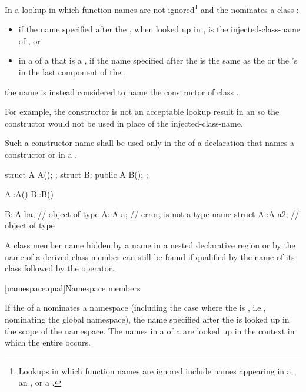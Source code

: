 \pnum
In a lookup in which function names are not ignored\footnote{Lookups in which
function names are ignored include names appearing in a
, an
, or a .}
and the  nominates a class :
\begin{itemize}
\item if the name specified after the ,
when looked up in , is the injected-class-name of , or
\item
in a  of
a  that is a ,
if the name specified after the  is the same as the
 or the 's
 in the last component of the ,
\end{itemize}
the name is instead considered to name the
constructor of class . \begin{note} For example, the constructor
is not an acceptable lookup result in an
 so the constructor would not be
used in place of the injected-class-name. \end{note} Such a constructor
name shall be used only in the  of a declaration
that names a constructor or in a .
\begin{example}
\begin{codeblock}
struct A { A(); };
struct B: public A { B(); };

A::A() { }
B::B() { }

B::A ba;            // object of type 
A::A a;             // error,  is not a type name
struct A::A a2;     // object of type 
\end{codeblock}
\end{example}

\pnum
A class member name hidden by a name in a nested declarative region or
by the name of a derived class member can still be found if qualified by
the name of its class followed by the \tcode{::} operator.

[namespace.qual]{Namespace members}

\pnum
{}%
If the  of a 
nominates a namespace (including the case where the
 is \tcode{::}, i.e., nominating
the global namespace), the name specified after the
 is looked up in the scope of the
namespace.
The names in a  of a
 are looked up in the context in which the
entire  occurs.

